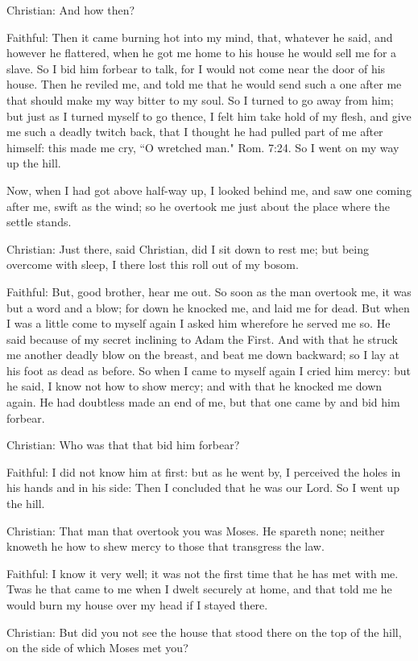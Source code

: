Christian: And how then?

Faithful: Then it came burning hot into my mind, that, whatever he said, and however he flattered, when he got me home to his house he would sell me for a slave. So I bid him forbear to talk, for I would not come near the door of his house. Then he reviled me, and told me that he would send such a one after me that should make my way bitter to my soul. So I turned to go away from him; but just as I turned myself to go thence, I felt him take hold of my flesh, and give me such a deadly twitch back, that I thought he had pulled part of me after himself: this made me cry, ``O wretched man." Rom. 7:24. So I went on my way up the hill.

Now, when I had got above half-way up, I looked behind me, and saw one coming after me, swift as the wind; so he overtook me just about the place where the settle stands.

Christian: Just there, said Christian, did I sit down to rest me; but being overcome with sleep, I there lost this roll out of my bosom.

Faithful: But, good brother, hear me out. So soon as the man overtook me, it was but a word and a blow; for down he knocked me, and laid me for dead. But when I was a little come to myself again I asked him wherefore he served me so. He said because of my secret inclining to Adam the First. And with that he struck me another deadly blow on the breast, and beat me down backward; so I lay at his foot as dead as before. So when I came to myself again I cried him mercy: but he said, I know not how to show mercy; and with that he knocked me down again. He had doubtless made an end of me, but that one came by and bid him forbear.

Christian: Who was that that bid him forbear?

Faithful: I did not know him at first: but as he went by, I perceived the holes in his hands and in his side: Then I concluded that he was our Lord. So I went up the hill.

Christian: That man that overtook you was Moses. He spareth none; neither knoweth he how to shew mercy to those that transgress the law.

Faithful: I know it very well; it was not the first time that he has met with me. Twas he that came to me when I dwelt securely at home, and that told me he would burn my house over my head if I stayed there.

Christian: But did you not see the house that stood there on the top of the hill, on the side of which Moses met you?

